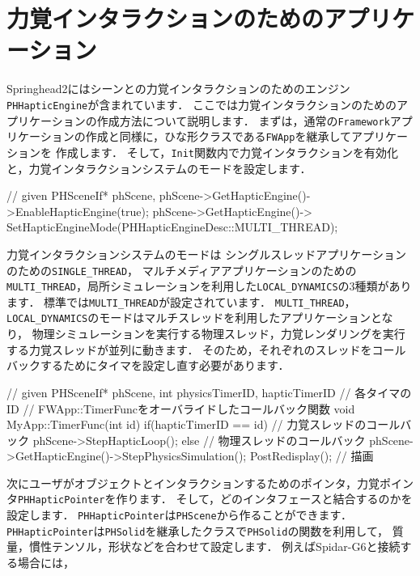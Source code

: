 \section{力覚インタラクションのためのアプリケーション}
Springhead2にはシーンとの力覚インタラクションのためのエンジン\texttt{PHHapticEngine}が含まれています．
\KLUDGE ここでは力覚インタラクションのためのアプリケーションの作成方法について説明します．
\KLUDGE まずは，通常の\texttt{Framework}アプリケーションの作成と同様に，ひな形クラスである\texttt{FWApp}を継承してアプリケーションを
\KLUDGE 作成します．
\KLUDGE そして，\texttt{Init}関数内で力覚インタラクションを有効化と，力覚インタラクションシステムのモードを設定します．
\begin{sourcecode}
	// given PHSceneIf* phScene,
    phScene->GetHapticEngine()->EnableHapticEngine(true);
    phScene->GetHapticEngine()->
    SetHapticEngineMode(PHHapticEngineDesc::MULTI_THREAD);
\end{sourcecode}
\KLUDGE 力覚インタラクションシステムのモードは
\KLUDGE シングルスレッドアプリケーションのための\texttt{SINGLE\_THREAD}，
\KLUDGE マルチメディアアプリケーションのための\texttt{MULTI\_THREAD}，局所シミュレーションを利用した\texttt{LOCAL\_DYNAMICS}の3種類があります．
\KLUDGE 標準では\texttt{MULTI\_THREAD}が設定されています．
\texttt{MULTI\_THREAD}，\texttt{LOCAL\_DYNAMICS}のモードはマルチスレッドを利用したアプリケーションとなり，
\KLUDGE 物理シミュレーションを実行する物理スレッド，力覚レンダリングを実行する力覚スレッドが並列に動きます．
\KLUDGE そのため，それぞれのスレッドをコールバックするためにタイマを設定し直す必要があります．
\clearpage

\begin{sourcecode}
	// given PHSceneIf* phScene,
	int physicsTimerID, hapticTimerID // 各タイマのID
	// FWApp::TimerFuncをオーバライドしたコールバック関数
	void MyApp::TimerFunc(int id){
        if(hapticTimerID == id){
            // 力覚スレッドのコールバック
            phScene->StepHapticLoop();	
        }else{
            // 物理スレッドのコールバック
            phScene->GetHapticEngine()->StepPhysicsSimulation();	
            PostRedisplay();	// 描画
        }	
	}	
\end{sourcecode}


\KLUDGE 次にユーザがオブジェクトとインタラクションするためのポインタ，力覚ポインタ\texttt{PHHapticPointer}を作ります．
\KLUDGE そして，どのインタフェースと結合するのかを設定します．
\texttt{PHHapticPointer}は\texttt{PHScene}から作ることができます．
\texttt{PHHapticPointer}は\texttt{PHSolid}を継承したクラスで\texttt{PHSolid}の関数を利用して，
\KLUDGE 質量，慣性テンソル，形状などを合わせて設定します．
\KLUDGE 例えばSpidar-G6と接続する場合には，

